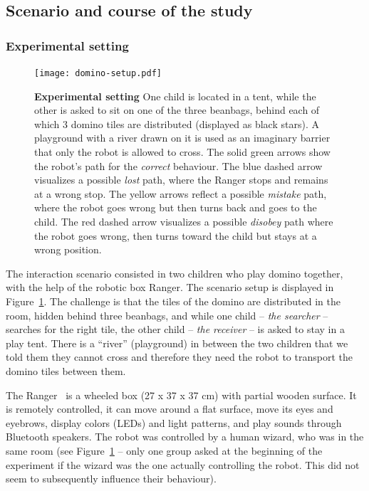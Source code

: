 \documentclass{sig-alternate}
\begin{document}
\subsection{Scenario and course of the study}

\subsubsection{Experimental setting}

\begin{figure}[ht!] 
    \centering 
    \texttt{[image: domino-setup.pdf]} 
    \caption{\small \textbf{Experimental setting} One child is located in a
        tent, while the other is asked to sit on one of the three beanbags,
        behind each of which 3 domino tiles are distributed (displayed as black
        stars). A playground with a river drawn on it is used as an imaginary
        barrier that only the robot is allowed to cross. The solid green arrows
        show the robot's path for the \textit{correct} behaviour. The blue
        dashed arrow visualizes a possible \textit{lost} path, where the Ranger
        stops and remains at a wrong stop. The yellow arrows reflect a possible
        \textit{mistake} path, where the robot goes wrong but then turns back
        and goes to the child. The red dashed arrow visualizes a possible
        \textit{disobey} path where the robot goes wrong, then turns toward the
        child but stays at a wrong position.} 

    \label{fig:domino-setup} 
\end{figure}


The interaction scenario consisted in two children who play domino together,
with the help of the robotic box Ranger. The scenario setup is displayed in
Figure~\ref{fig:domino-setup}. The challenge is that the tiles of the domino are
distributed in the room, hidden behind three beanbags, and while one child --
\textit{the searcher} -- searches for the right tile, the other child --
\textit{the receiver} -- is asked to stay in a play tent. There is a ``river''
(playground) in between the two children that we told them they cannot cross
and therefore they need the robot to transport the domino tiles between them.

The Ranger~\cite{mondada2014ranger} is a wheeled box (27 x 37 x 37 cm) with
partial wooden surface. It is remotely controlled, it can move around a flat
surface, move its eyes and eyebrows, display colors (LEDs) and light patterns,
and play sounds through Bluetooth speakers.  The robot was controlled by a human
wizard, who was in the same room (see Figure~\ref{fig:domino-setup} -- only one
group asked at the beginning of the experiment if the wizard was the one
actually controlling the robot. This did not seem to subsequently influence
their behaviour).
\end{document}
